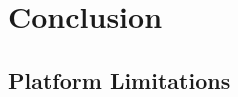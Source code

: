 \chapter{Conclusion}
\label{chap:conclusion}

\section{Platform Limitations}
\label{sec:platform-limitations}
